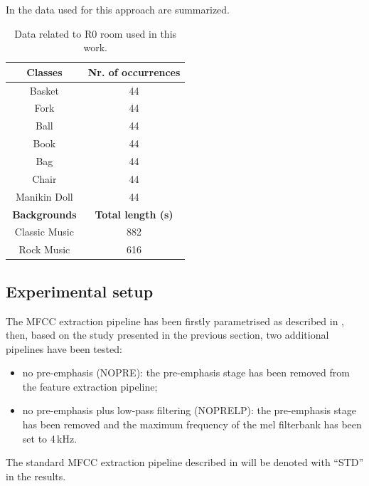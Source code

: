 In  the data used for this approach are summarized.
\begin{table}[t]
	\caption{Data related to R0 room used in this work.}
	\label{tab:eswa_dataset}
	\begin{center}
		\begin{tabular}[t]{c|c}
			
			\hline
			\textbf{Classes}  & \textbf{Nr. of occurrences} \\ %
			\hline
			
			Basket      			&   44    	\\
			Fork        			&   44     	\\
			Ball       				&   44    	\\
			Book        			&   44    	\\
			Bag         			&   44    	\\
			Chair       			&   44    	\\
			$\,$ Manikin Doll $\,$ 	&   44    	\\
			\hline
			\textbf{Backgrounds} & \textbf{Total length (s)}\\			
			Classic Music  			&   882   	\\
			Rock Music  			&   616   	\\
			\hline
		\end{tabular}
	\end{center}
\end{table}

\subsection{Experimental setup}
The MFCC extraction pipeline has been firstly parametrised as described in , then, based on the study presented in the previous section, two additional pipelines have been tested:
\begin{itemize}
	\item no pre-emphasis (NOPRE): the pre-emphasis stage has been removed from the feature extraction pipeline;
	\item no pre-emphasis plus low-pass filtering (NOPRELP): the pre-emphasis stage has been removed and the maximum frequency of the mel filterbank has been set to 4\,kHz.
\end{itemize}
The standard MFCC extraction pipeline described in  will be denoted with ``STD'' in the results.

